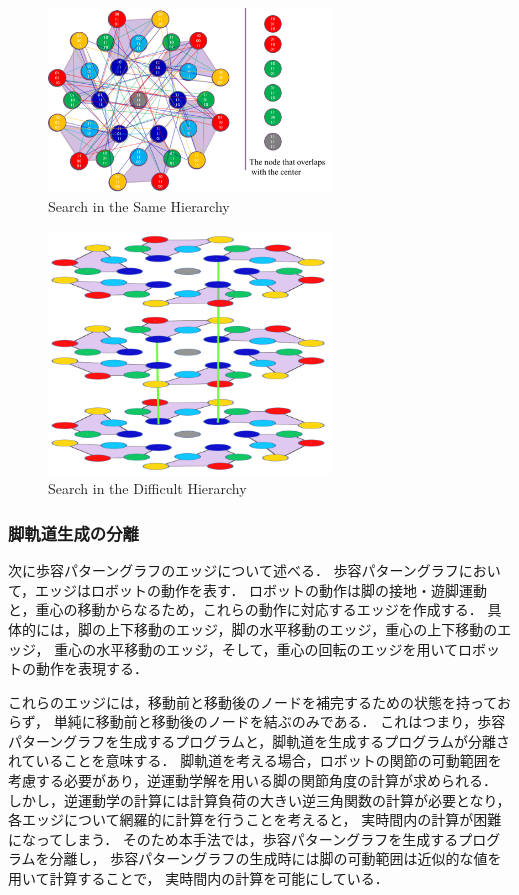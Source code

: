 \begin{figure}[htbp]
  \begin{center}
    \includegraphics[width=75mm, clip]{figure/chapter2/hierarchy2.png}
    \caption{Search in the Same Hierarchy}
    \label{fig:hierarchy2} %
  \end{center}
\end{figure}

\begin{figure}[htbp]
  \begin{center}
    \includegraphics[width=75mm, clip]{figure/chapter2/hierarchy.png}
    \caption{Search in the Difficult Hierarchy}
    \label{fig:hierarchy} %
  \end{center}
\end{figure}

\subsubsection{脚軌道生成の分離}
次に歩容パターングラフのエッジについて述べる．
歩容パターングラフにおいて，エッジはロボットの動作を表す．
ロボットの動作は脚の接地・遊脚運動と，重心の移動からなるため，これらの動作に対応するエッジを作成する．
具体的には，脚の上下移動のエッジ，脚の水平移動のエッジ，重心の上下移動のエッジ，
重心の水平移動のエッジ，そして，重心の回転のエッジを用いてロボットの動作を表現する．

これらのエッジには，移動前と移動後のノードを補完するための状態を持っておらず，
単純に移動前と移動後のノードを結ぶのみである．
これはつまり，歩容パターングラフを生成するプログラムと，脚軌道を生成するプログラムが分離されていることを意味する．
脚軌道を考える場合，ロボットの関節の可動範囲を考慮する必要があり，逆運動学解を用いる脚の関節角度の計算が求められる．
しかし，逆運動学の計算には計算負荷の大きい逆三角関数の計算が必要となり，各エッジについて網羅的に計算を行うことを考えると，
実時間内の計算が困難になってしまう．
そのため本手法では，歩容パターングラフを生成するプログラムを分離し，
歩容パターングラフの生成時には脚の可動範囲は近似的な値を用いて計算することで，
実時間内の計算を可能にしている．

